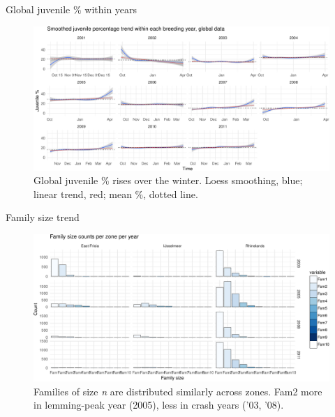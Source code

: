 \documentclass[10pt,ignorenonframetext,]{beamer}
\begin{document}
\begin{frame}{Global juvenile \% within years}

\begin{figure}[htbp]
\centering
\includegraphics{goose_code008pres_files/figure-beamer/trend_juvprop_yearly-1.pdf}
\caption{Global juvenile \% rises over the winter. Loess smoothing,
blue; linear trend, red; mean \%, dotted line.}
\end{figure}

\end{frame}

\begin{frame}{Family size trend}

\begin{figure}[htbp]
\centering
\includegraphics{goose_code008pres_files/figure-beamer/plot_fams_per_year_perzone_persize-1.pdf}
\caption{Families of size \emph{n} are distributed similarly across
zones. Fam2 more in lemming-peak year (2005), less in crash years ('03,
'08).}
\end{figure}

\end{frame}
\end{document}
